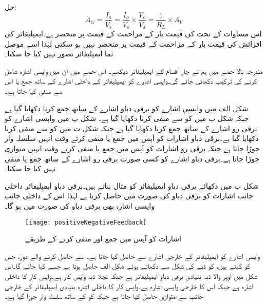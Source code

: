 حل:
\begin{equation*}
A_G=\frac{I_o}{V_s}=\frac{I_o}{V_o} \times \frac{V_o}{V_s}=\frac{1}{R_L} \times A_V
\end{equation*}
اس مساوات کے تحت  کی قیمت بار کے مزاحمت  کے قیمت پر منحصر ہے۔ایمپلیفائر کی افزائش کی قیمت بار کے مزاحمت کے قیمت پر منحصر نہیں ہو سکتی لہٰذا اسے موصل نما ایمپلیفائر تصور نہیں کیا جا سکتا۔ 


مندرجہ بالا حصے میں ہم نے چار اقسام کے ایمپلیفائر دیکھے۔ اس حصے میں ان میں واپسی اشارہ شامل کرنے کی ترکیب دکھائی جائے گی۔واپسی اشارے کو ایمپلیفائر کے داخلی اشارے کے ساتھ جمع یا اس سے منفی کیا جاتا ہے۔

 شکل  الف  میں واپسی اشارے  کو برقی دباو اشارے  کے ساتھ  جمع کرنا دکھایا گیا ہے جبکہ شکل  ب میں   کو  سے منفی کرنا دکھایا گیا ہے۔ شکل  پ  میں واپسی اشارے  کو برقی رو اشارے   کے ساتھ جمع کرنا دکھایا گیا ہے جبکہ شکل  ت میں  کو   سے منفی کرنا دکھایا گیا ہے۔برقی دباو اشارات کو آپس میں جمع یا منفی کرتے وقت انہیں سلسلہ وار جوڑا جاتا ہے جبکہ برقی رو اشارات کو آپس میں جمع یا منفی کرتے وقت انہیں متوازی جوڑا جاتا ہے۔برقی دباو اشارے کو کسی صورت برقی رو اشارے کے ساتھ جمع یا منفی نہیں کیا جا سکتا۔ 

شکل  ب میں دکھائے برقی دباو ایمپلیفائر کو مثال بناتے ہیں۔برقی دباو ایمپلیفائر داخلی جانب اشارات کو برقی دباو کی صورت میں حاصل کرتا ہے لہٰذا اس کے داخلی جانب واپسی اشارہ بھی برقی دباو کی صورت میں ہو گا۔
\begin{figure}
\centering
\texttt{[image: positiveNegativeFeedback]}
\caption{اشارات کو آپس میں جمع اور منفی کرنے کے طریقے}
\label{شکل_واپسی_اشارات_جمع_منفی_کے_طریقے}
\end{figure}
واپسی اشارے کو ایمپلیفائر کے خارجی اشارے سے حاصل کیا جاتا ہے۔  سے  حاصل کرنے والے دور، جس کو  کہتے ہیں، کو ڈبے کی شکل سے دکھاتے ہوئے شکل  الف حاصل ہوتا ہے جسے  کہا جائے گا۔اس شکل میں اوپر والا ڈبہ بنیادی برقی دباو ایمپلیفائر ہے جبکہ نچلا ڈبہ واپس کار ہے۔واپس کار کا داخلی اشارہ  ہے جبکہ اس کا خارجی واپسی اشارہ  ہے۔واپس کار  کا داخلی  اشارہ بنیادی ایمپلیفائر کے خارجی جانب سے   متوازی حاصل کیا جاتا ہے جبکہ  کو   کے ساتھ  سلسلہ وار جوڑا گیا ہے۔

